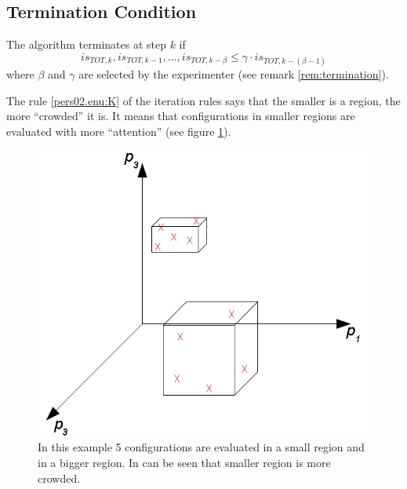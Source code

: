 \subsection{Termination Condition}
The algorithm terminates at step $k$ if
\[
is_{TOT,k},is_{TOT,k-1},\dots,is_{TOT,k-\beta}\le\gamma\cdot is_{TOT,k-\left(\beta-1\right)}
\]
 where $\beta$ and $\gamma$ are selected by the experimenter (see
remark \ref{rem:termination}).
\begin{rem}
\label{pers02.rem:smaller_regions}The rule \ref{pers02.enu:K} of
the iteration rules says that the smaller is a region, the more ``crowded''
it is. It means that configurations in smaller regions are evaluated
with more ``attention'' (see figure \ref{pers02.fig:small_and_big}).

\begin{figure}[h]
\includegraphics[width=0.9\columnwidth]{img/small_and_big}

\caption{\label{pers02.fig:small_and_big}In this example 5 configurations
are evaluated in a small region and in a bigger region. In can be
seen that smaller region is more crowded.}


\end{figure}

\end{rem}

